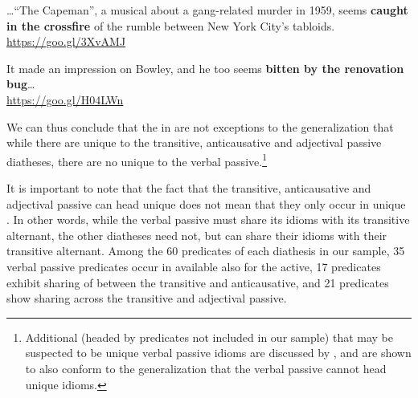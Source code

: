 \documentclass[output=paper]{langsci/langscibook}
\begin{document}
\ea\label{ex:key:20.16}
    \dots \enquote{The Capeman}, a musical about a gang-related murder in 1959,
    seems \textbf{caught in the crossfire} of the rumble between New York
    City's tabloids.\\\hspace*{\fill}\url{https://goo.gl/3XvAMJ}
\z

\ea\label{ex:key:20.17}
    It made an impression on Bowley, and he too seems \textbf{bitten by the
    renovation bug}\dots{}\\\hspace*{\fill}\url{https://goo.gl/H04LWn}
\z

We can thus conclude that the  in  are not exceptions to
the generalization that while there are  unique to the transitive,
anticausative and adjectival passive diatheses, there are no  unique to
the verbal passive.\footnote{ \textrm{Additional  (headed by predicates
not included in our sample) that may be suspected to be unique verbal passive
idioms are discussed by \citet{HorSil2019}, and are shown to also
conform to the generalization that the verbal passive cannot head unique
idioms.}}\tss{}

It is important to note that the fact that the transitive, anticausative and
adjectival passive can head unique  does not mean that they only occur in
unique . In other words, while the verbal passive must share its idioms
with its transitive alternant, the other diatheses need not, but can share their
idioms with their transitive alternant. Among the 60 predicates of each
diathesis in our sample, 35 verbal passive predicates occur in  available
also for the active, 17 predicates exhibit sharing of  between the
transitive and anticausative, and 21 predicates show sharing across the
transitive and adjectival passive.
\end{document}
